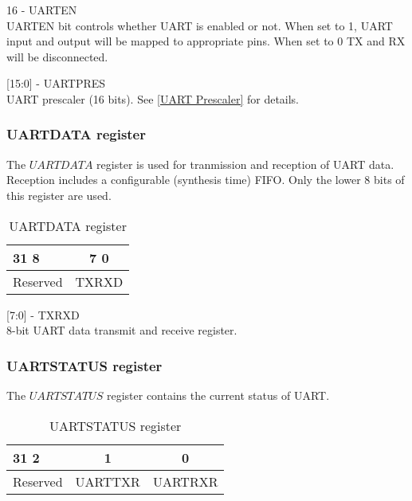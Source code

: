 \begin{description}
\item{16 - UARTEN} \hfill \\
UARTEN bit controls whether UART is enabled or not. When set to 1, UART input
and output will be mapped to appropriate pins. When set to 0 TX and RX will be
disconnected.
\item{[15:0] - UARTPRES} \hfill \\
 UART prescaler (16 bits). See \ref{UART Prescaler} for details.
\end{description}


\subsubsection{UARTDATA register}
The $UARTDATA$ register is used for tranmission and reception of UART data. Reception includes a configurable (synthesis time) FIFO.
Only the lower 8 bits of this register are used.

\begin{table}[H]
\begin{center}
\begin{tabularx}{14cm}{Xc}
31 \hfill 8 & 7 \hfill 0  \\
\hline
\multicolumn{1}{|c|}{Reserved} & 
\multicolumn{1}{|c|}{TXRXD} \\
\hline
\end{tabularx}
\caption{UARTDATA register}
\end{center}
\end{table}

\begin{description}
\item{[7:0] - TXRXD} \hfill \\
 8-bit UART data transmit and receive register.
\end{description}

\subsubsection{UARTSTATUS register}

The $UARTSTATUS$ register contains the current status of UART.


\begin{table}[H]
\begin{center}
\begin{tabularx}{14cm}{Xcc}
31 \hfill 2 & 1 & 0 \\
\hline
\multicolumn{1}{|c|}{Reserved} & 
\multicolumn{1}{|c|}{UARTTXR} &
\multicolumn{1}{|c|}{UARTRXR} \\
\hline
\end{tabularx}
\caption{UARTSTATUS register}
\end{center}
\end{table}

